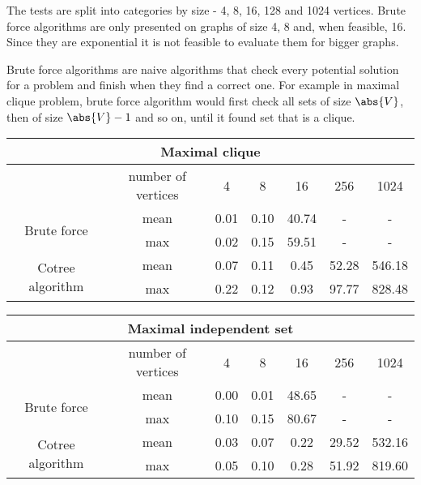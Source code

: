 The tests are split into categories by size - 4, 8, 16, 128 and 1024  vertices. Brute force algorithms are only presented on graphs of size 4, 8 and, when feasible, 16. Since they are exponential it is not feasible to evaluate them for bigger graphs.

Brute force algorithms are naive algorithms that check every potential solution for a problem and finish when they find a correct one. For example in maximal clique problem, brute force algorithm would first check all sets of size $\abs{V}$, then of size $\abs{V}-1$ and so on, until it found set that is a clique.

\begin{center}
    \begin{tabular}{|c|c|c|c|c|c|c|}
        \hline
        \multicolumn{7}{|c|}{Maximal clique}                                                          \\
        \hline
                                          & number of vertices & 4    & 8    & 16    & 256   & 1024   \\
        \hline

        \multirow{2}{*}{Brute force}      & mean               & 0.01 & 0.10 & 40.74 & -     & -      \\
                                          & max                & 0.02 & 0.15 & 59.51 & -     & -      \\
        \hline
        \multirow{2}{*}{Cotree algorithm} & mean               & 0.07 & 0.11 & 0.45  & 52.28 & 546.18 \\
                                          & max                & 0.22 & 0.12 & 0.93  & 97.77 & 828.48 \\
        \hline
    \end{tabular}
\end{center}


\begin{center}
    \begin{tabular}{|c|c|c|c|c|c|c|}
        \hline
        \multicolumn{7}{|c|}{Maximal independent set}                                                 \\
        \hline
                                          & number of vertices & 4    & 8    & 16    & 256   & 1024   \\
        \hline

        \multirow{2}{*}{Brute force}      & mean               & 0.00 & 0.01 & 48.65 & -     & -      \\
                                          & max                & 0.10 & 0.15 & 80.67 & -     & -      \\
        \hline
        \multirow{2}{*}{Cotree algorithm} & mean               & 0.03 & 0.07 & 0.22  & 29.52 & 532.16 \\
                                          & max                & 0.05 & 0.10 & 0.28  & 51.92 & 819.60 \\
        \hline
    \end{tabular}
\end{center}


